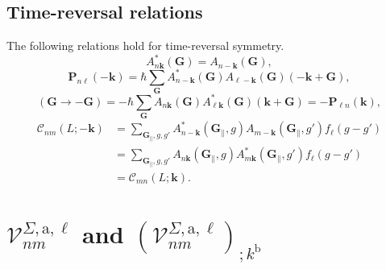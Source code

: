 \subsection{Time-reversal relations}
The following relations hold for time-reversal symmetry.
\begin{equation*}
A_{n\mathbf{k}}^{*}(\mathbf{G}) = A_{n-\mathbf{k}}(\mathbf{G}),
\end{equation*}
\begin{equation*}
\mathbf{P}_{n\ell }(-\mathbf{k}) 
=   \hbar\sum_{\mathbf{G}}
    A_{n-\mathbf{k}}^{*}(\mathbf{G})
    A_{\ell -\mathbf{k}}(\mathbf{G})(-\mathbf{k}+\mathbf{G}),
\end{equation*}
\begin{equation*}
(\mathbf{G}\rightarrow-\mathbf{G})
=   -\hbar\sum_{\mathbf{G}}
    A_{n\mathbf{k}}(\mathbf{G})
    A_{\ell\mathbf{k}}^{*}(\mathbf{G})(\mathbf{k}+\mathbf{G})
=   -\mathbf{P}_{\ell n}(\mathbf{k}),
\end{equation*}
\begin{align*}
\mathcal{C}_{nm} (L;-\mathbf{k}) 
&=  \sum_{\mathbf{G}_{\parallel},g,g'}
    A_{n-\mathbf{k}}^{*}(\mathbf{G}_{\parallel},g)
    A_{m-\mathbf{k}}(\mathbf{G}_{\parallel},g')
    f_{\ell}(g-g') \\
&=  \sum_{\mathbf{G}_{\parallel},g,g'}
    A_{n\mathbf{k}} (\mathbf{G}_{\parallel},g)
    A_{m\mathbf{k}}^{*} (\mathbf{G}_{\parallel},g')
    f_{\ell}(g-g') \\
&=  \mathcal{C}_{mn}(L;\mathbf{k}).
\end{align*}



\section[The Layered Velocity Operator and its Generalized Derivative.]
{\texorpdfstring{$\mathcal{V}^{\Sigma,\mathrm{a},\ell}_{nm}$}{Vnm} and 
\texorpdfstring{
$\left(\mathcal{V}^{\Sigma,\mathrm{a},\ell}_{nm}\right)_{;k^\mathrm{b}}$}
{(Vnm);kb}}
\label{app:calvs}

